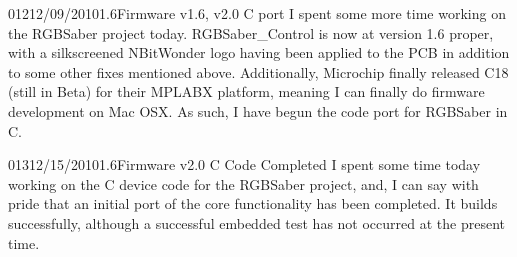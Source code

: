 \documentclass[12pt,letterpaper,onecolumn]{article}
\begin{document}
\begin{nbentry}{012}{12/09/2010}{1.6}{Firmware v1.6, v2.0 C port}
	I spent some more time working on the RGBSaber project today. RGBSaber\_Control is now at version 1.6 proper, with a silkscreened NBitWonder logo having been applied to the PCB in addition to some other fixes mentioned above. Additionally, Microchip finally released C18 (still in Beta) for their MPLABX platform, meaning I can finally do firmware development on Mac OSX. As such, I have begun the code port for RGBSaber in C.
\end{nbentry}

\begin{nbentry}{013}{12/15/2010}{1.6}{Firmware v2.0 C Code Completed}
	I spent some time today working on the C device code for the RGBSaber project, and, I can say with pride that an initial port of the core functionality has been completed. It builds successfully, although a successful embedded test has not occurred at the present time.
\end{nbentry}

\end{document}
